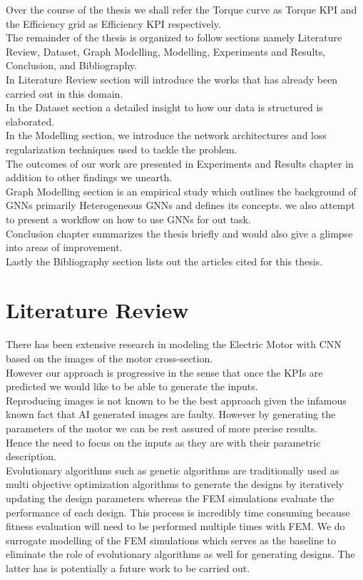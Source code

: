 \documentclass{report} %
\begin{document}
Over the course of the thesis we shall refer the Torque curve as Torque KPI and the Efficiency grid as Efficiency KPI respectively.\\
The remainder of the thesis is organized to follow sections namely Literature Review, Dataset, Graph Modelling, Modelling, Experiments and Results, Conclusion, and Bibliography.\\
In Literature Review section will introduce the works that has already been carried out in this domain. \\
In the Dataset section a detailed insight to how our data is structured is elaborated.\\
In the Modelling section, we introduce the network architectures and loss regularization techniques used to tackle the problem. \\
The outcomes of our work are presented in Experiments and Results chapter in addition to other findings we unearth.\\ 
Graph Modelling section is an empirical study which outlines the background of \ac{GNN}s primarily Heterogeneous \ac{GNN}s and defines its concepts.
we also attempt to present a workflow on how to use \ac{GNN}s for out task.\\
Conclusion chapter summarizes the thesis briefly and would also give a glimpse into areas of improvement. \\
Lastly the Bibliography section lists out the articles cited for this thesis.\\

\newpage 

\chapter{Literature Review} 
There has been extensive research in modeling the Electric Motor with \ac{CNN} based on the images of the motor cross-section. \\
However our approach is progressive in the sense that once the \ac{KPI}s are predicted we would like to be able to generate the inputs.\\
Reproducing images is not known to be the best approach given the infamous known fact that AI generated images are faulty. 
However by generating the parameters of the motor we can be rest assured of more precise results. \\
Hence the need to focus on the inputs as they are with their parametric description.\\
Evolutionary algorithms such as genetic algorithms are traditionally used as multi objective optimization algorithms to generate the designs by iteratively
updating the design parameters whereas the \ac{FEM} simulations evaluate the performance of each design.
This process is incredibly time consuming because fitness evaluation will need to be performed multiple times with \ac{FEM}.
We do surrogate modelling of the \ac{FEM} simulations which serves as the baseline to eliminate the role of evolutionary algorithms as well for generating designs.
The latter has is potentially a future work to be carried out.
\end{document}
